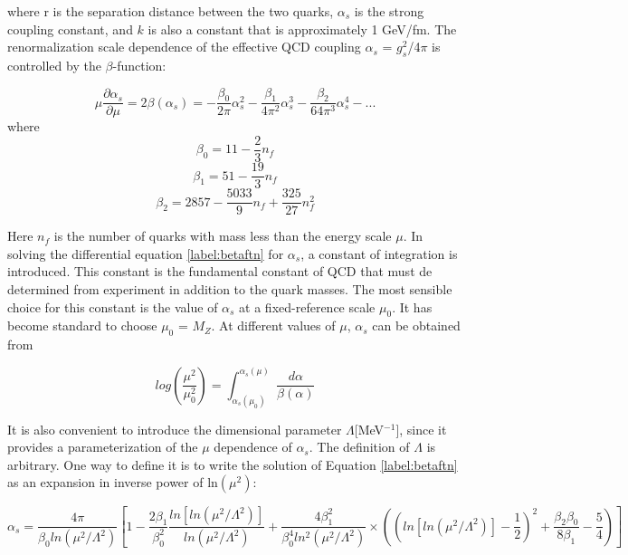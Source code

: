 where r is the separation distance between the two quarks, $\alpha_{s}$ is the strong coupling constant, and $k$ is also a constant that is approximately 1 GeV/fm. The renormalization scale dependence of the effective QCD coupling $\alpha_{s}$ = $g^{2}_{s}$/4$\pi$ is controlled by the $\beta$-function:


 \begin{equation}\label{label:betaftn}
\mu \frac{\partial \alpha_{s}}{\partial \mu} = 2\beta(\alpha_{s}) = - \frac{\beta_{0}}{2\pi}\alpha_{s}^{2} - \frac{\beta_{1}}{4\pi^{2}}\alpha_{s}^{3} - \frac{\beta_{2}}{64\pi^{3}}\alpha_{s}^{4} - ...
\end{equation}
where
 \begin{equation}\label{label:b0}
\beta_{0} = 11 - \frac{2}{3}n_{f}
\end{equation}
 \begin{equation}\label{label:b1}
\beta_{1} = 51 - \frac{19}{3}n_{f}
\end{equation}
 \begin{equation}\label{label:b2}
\beta_{2} = 2857 - \frac{5033}{9}n_{f} + \frac{325}{27}n_{f}^{2}
\end{equation}

Here $n_{f}$ is the number of quarks with mass less than the energy scale $\mu$. In solving the differential equation \ref{label:betaftn} for $\alpha_{s}$,  a constant of integration is introduced. This constant is the fundamental constant of QCD that must de determined from experiment in addition to the quark masses. The most sensible choice for this constant is the value of $\alpha_{s}$ at a fixed-reference scale $\mu_{0}$. It has become standard to choose  $\mu_{0}$ = $M_{Z}$. At different
values of $\mu$, $\alpha_{s}$ can be obtained from 

 \begin{equation}\label{label:cal}
log(\frac{\mu^{2}}{\mu_{0}^{2}}) = \int_{\alpha_{s}(\mu_{0})}^{\alpha_{s}(\mu)} \frac{d\alpha}{\beta(\alpha)}
\end{equation}

It is also convenient to introduce the dimensional parameter $\Lambda $[MeV$^{-1}$], since it provides a parameterization of the $\mu$ dependence of $\alpha_{s}$. The definition of $\Lambda$ is arbitrary. One way to define it is to write the solution of Equation \ref{label:betaftn} as an expansion in inverse power of ln$(\mu^{2})$:
 
 \begin{equation}\label{label:expansions}
\alpha_{s} = \frac{4\pi}{\beta_{0}ln(\mu^{2}/\Lambda^{2})}[1 - \frac{2\beta_{1}}{\beta_{0}^{2}} \frac{ln[ln(\mu^{2}/\Lambda^{2})]}{ln(\mu^{2}/\Lambda^{2})} + \frac{4\beta_{1}^{2}}{\beta_{0}^{4}ln^{2}(\mu^{2}/\Lambda^{2})} \times ((ln[ln(\mu^{2}/\Lambda^{2})] - \frac{1}{2})^{2} + \frac{\beta_{2}\beta_{0}}{8\beta_{1}} - \frac{5}{4})]
\end{equation}


